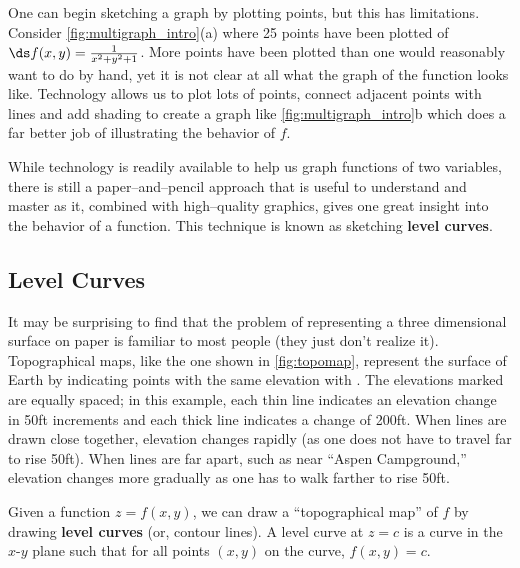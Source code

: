 One can begin sketching a graph by plotting points, but this has limitations. Consider \autoref{fig:multigraph_intro}(a) where 25 points have been plotted of $\ds f(x,y) = \frac1{x^2+y^2+1}$. More points have been plotted than one would reasonably want to do by hand, yet it is not clear at all what the graph of the function looks like. Technology allows us to plot lots of points, connect adjacent points with lines and add shading to create a graph like \autoref{fig:multigraph_intro}b which does a far better job of illustrating the behavior of $f$.

While technology is readily available to help us graph functions of two variables, there is still a paper--and--pencil approach that is useful to understand and master as it, combined with high--quality graphics, gives one great insight into the behavior of a function. This technique is known as sketching \textbf{level curves}.

\subsection*{Level Curves}

It may be surprising to find that the problem of representing a three dimensional surface on paper is familiar to most people (they just don't realize it). Topographical maps, like the one shown in \autoref{fig:topomap}, represent the surface of Earth by indicating points with the same elevation with . The elevations marked are equally spaced; in this example, each thin line indicates an elevation change in 50ft increments and each thick line indicates a change of 200ft. When lines are drawn close together, elevation changes rapidly (as one does not have to travel far to rise 50ft). When lines are far apart, such as near ``Aspen Campground,'' elevation changes more gradually as one has to walk farther to rise 50ft.


Given a function $z=f(x,y)$, we can draw a ``topographical map'' of $f$ by drawing \textbf{level curves} (or, contour lines). A level curve at $z=c$ is a curve in the $x$-$y$ plane such that for all points $(x,y)$ on the curve, $f(x,y) = c$. 

